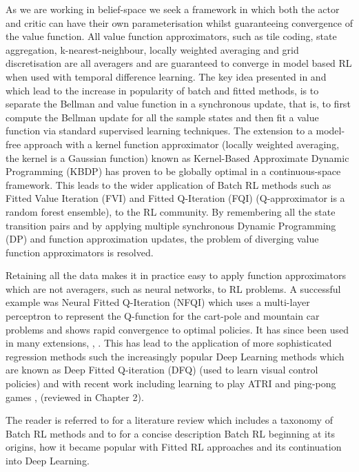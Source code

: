 As we are working in belief-space we seek a framework in which both the actor and critic can have 
their own parameterisation whilst guaranteeing convergence of the value function. All value function approximators, 
such as tile coding,  state aggregation, k-nearest-neighbour, locally weighted averaging and grid discretisation 
are all averagers and are guaranteed to converge in model based RL \cite{stable_FA_gordon_1995} when used with 
temporal difference learning. The key idea presented in \cite{stable_FA_gordon_1995} and which lead to the increase in popularity
of batch and fitted methods, is to separate the Bellman and value function in a synchronous update, that 
is, to first compute the Bellman update for all the sample states and then fit a value function via standard supervised 
learning techniques. The extension to a model-free approach with a kernel function approximator (locally weighted averaging, the 
kernel is a Gaussian function) known as Kernel-Based Approximate Dynamic Programming (KBDP) \cite{kernel_rl_ormoneit_2002}
has proven to be globally optimal in a continuous-space framework. This leads to the wider application of Batch RL methods 
such as Fitted Value Iteration (FVI) \cite{fvi_uav_2010} and Fitted Q-Iteration (FQI) \cite{EGW05} (Q-approximator is a random forest ensemble),
\cite{fqi_nips_peter_2009} to the RL community. By remembering all the state transition pairs and by applying multiple 
synchronous Dynamic Programming (DP) and function approximation updates, the problem of diverging value function approximators is resolved. 

Retaining all the data makes it in practice easy to apply function approximators which are not averagers, such as neural networks,
to RL problems. A successful example was Neural Fitted Q-Iteration (NFQI) \cite{Riedmiller2005} which 
uses a multi-layer perceptron to represent the Q-function for the cart-pole and mountain car problems and 
shows rapid convergence to optimal policies. It has since been used in many extensions, \cite{NAC_2008}, \cite{rl_gmm_2010}.
This has lead to the application of more sophisticated regression methods such the increasingly popular Deep Learning methods 
which are known as Deep Fitted Q-iteration (DFQ) \cite{Lange_riedmiller_2010} (used to learn visual control policies) 
and with recent work including learning to play ATRI and ping-pong games \cite{mnih-dqn-2015}, \cite{DRQ_AAAI_2015} (reviewed
in Chapter 2).

The reader is referred to \cite{approx_rl_overview_2011} for a literature review which includes a taxonomy of 
Batch RL methods and to \cite[Chap 2]{RL_state_art_2012} for a concise description Batch RL beginning at 
its origins, how it became popular with Fitted RL approaches and its continuation into Deep Learning.

